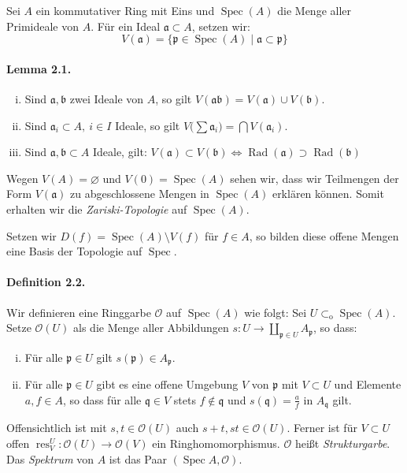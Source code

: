 Sei $A$ ein kommutativer Ring mit Eins und $\operatorname{Spec}(A)$ die Menge aller Primideale von $A$. Für ein Ideal $\mathfrak{a}\subset A$, setzen wir:
\[V(\mathfrak{a}) = \{\mathfrak{p}\in\operatorname{Spec}(A)\mid \mathfrak{a}\subset\mathfrak{p}\} \]

\paragraph{Lemma 2.1.}\label{2.1} \begin{enumerate}[(i)]
\item Sind $\mathfrak{a},\mathfrak{b}$ zwei Ideale von $A$, so gilt $V(\mathfrak{ab})=V(\mathfrak{a})\cup V(\mathfrak{b})$.
\item Sind $\mathfrak{a}_i\subset A,\ i\in I$ Ideale, so gilt $V\big(\sum\mathfrak{a}_i\big)=\bigcap V(\mathfrak{a}_i)$.
\item Sind $\mathfrak{a},\mathfrak{b}\subset A$ Ideale, gilt: $V(\mathfrak{a})\subset V(\mathfrak{b}) \iff \operatorname{Rad}(\mathfrak{a})\supset\operatorname{Rad}(\mathfrak{b})$
\end{enumerate}
Wegen $V(A)=\varnothing$ und $V(0)=\operatorname{Spec}(A)$ sehen wir, dass wir Teilmengen der Form $V(\mathfrak{a})$ zu abgeschlossene Mengen in $\operatorname{Spec}(A)$ erklären können. Somit erhalten wir die \textit{Zariski-Topologie} auf $\operatorname{Spec}(A)$.

Setzen wir $D(f)=\operatorname{Spec}(A)\setminus V(f)$ für $f\in A$, so bilden diese offene Mengen eine Basis der Topologie auf $\operatorname{Spec}$.

\paragraph{Definition 2.2.}\label{2.2} Wir definieren eine Ringgarbe $\mathcal{O}$ auf $\operatorname{Spec}(A)$ wie folgt: Sei $U\subset_\text{o}\operatorname{Spec}(A)$. Setze $\mathcal{O}(U)$ als die Menge aller Abbildungen $s:U\to\coprod_{\mathfrak{p}\in U}A_\mathfrak{p}$, so dass:
\begin{enumerate}[(i)]
\item Für alle $\mathfrak{p}\in U$ gilt $s(\mathfrak{p})\in A_\mathfrak{p}$.
\item Für alle $\mathfrak{p}\in U$ gibt es eine offene Umgebung $V$ von $\mathfrak{p}$ mit $V\subset U$ und Elemente $a,f\in A$, so dass für alle $\mathfrak{q}\in V$ stets $f\not\in\mathfrak{q}$ und $s(\mathfrak{q})=\frac{a}{f}$ in $A_\mathfrak{q}$ gilt.
\end{enumerate}
Offensichtlich ist mit $s,t\in\mathcal{O}(U)$ auch $s+t,st\in\mathcal{O}(U)$. Ferner ist für $V\subset U$ offen $\operatorname{res}^U_V:\mathcal{O}(U)\to\mathcal{O}(V)$ ein Ringhomomorphismus. $\mathcal{O}$ heißt \textit{Strukturgarbe}. Das \textit{Spektrum} von $A$ ist das Paar $(\operatorname{Spec}A,\mathcal{O})$.

